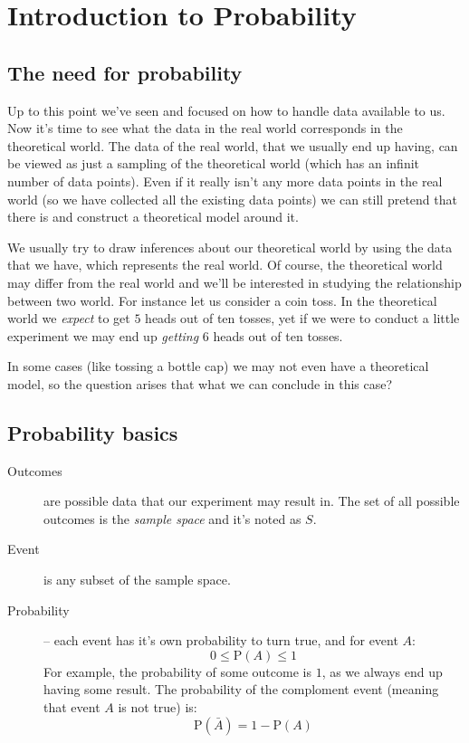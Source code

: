 \chapter*{Introduction to Probability}
\setcounter{section}{0}
\renewcommand*{\theHsection}{ch3.\the\value{section}}

\section{The need for probability}

Up to this point we've seen and focused on how to handle data available to us.
Now it's time to see what the data in the real world corresponds in the
theoretical world. The data of the real world, that we usually end up having,
can be viewed as just a sampling of the theoretical world (which has an
infinit number of data points). Even if it really isn't any more data points in
the real world (so we have collected all the existing data points) we can still
pretend that there is and construct a theoretical model around it.

We usually try to draw inferences about our theoretical world by using the data
that we have, which represents the real world. Of course, the theoretical world
may differ from the real world and we'll be interested in studying the
relationship between two world. For instance let us consider a coin toss. In the
theoretical world we \emph{expect} to get $5$ heads out of ten tosses, yet if we
were to conduct a little experiment we may end up \emph{getting} $6$ heads out
of ten tosses.

In some cases (like tossing a bottle cap) we may not even have a theoretical
model, so the question arises that what we can conclude in this case? 

\section{Probability basics}

\begin{description}
  \item[Outcomes] are possible data that our experiment may result in. The set
  of all possible outcomes is the \emph{sample space} and it's noted as $S$.
  \item[Event] is any subset of the sample space.
  \item[Probability] -- each event has it's own probability to turn true, and
  for event $A$:
  \[
  0 \leq \mbox{P}(A) \leq 1 
  \]
  For example, the probability of some outcome is $1$, as we always end up
  having some result. The probability of the comploment event (meaning that
  event $A$ is not true) is:
 \[
  \mbox{P}(\bar{A}) = 1 - \mbox{P}(A)
 \] 
\end{description}

